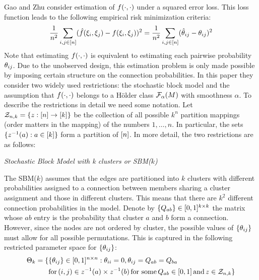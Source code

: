 \documentclass[11pt]{article}
\begin{document}
Gao and Zhu consider estimation of $f(\cdot, \cdot)$ under a squared error loss. This loss function leads to the following empirical risk minimization criteria:
\begin{equation}\label{eq:loss_func}
\frac{1}{n^2}\sum_{i, j \in \lbrack n\rbrack}(\hat{f}(\xi_i, \xi_j) - f(\xi_i, \xi_j))^2 =
\frac{1}{n^2}\sum_{i, j \in \lbrack n\rbrack}(\hat{\theta}_{ij} - \theta_{ij})^2
\end{equation}
Note that estimating $f(\cdot, \cdot)$ is equivalent to estimating each pairwise probability $\theta_{ij}$. Due to the unobserved design, this estimation problem is only made possible by imposing certain structure on the connection probabilities. In this paper they consider two widely used restrictions: the stochastic block model and the assumption that $f(\cdot, \cdot)$ belongs to a H\"older class $\mathcal{F}_{\alpha}(M)$ with smoothness $\alpha$. To describe the restrictions in detail we need some notation. Let $\mathcal{Z}_{n,k} = \{z : \lbrack n\rbrack \rightarrow \lbrack k\rbrack\}$ be the collection of all possible $k^n$ partition mappings (order matters in the mapping) of the numbers $1, \dots, n$. In particular, the sets $\{z^{-1}(a) : a \in \lbrack k\rbrack\}$ form a partition of $\lbrack n\rbrack$. In more detail, the two restrictions are as follows:

\begin{assump}\label{assump:sbm}
\textit{Stochastic Block Model with k clusters or SBM($k$)}

\noindent
The SBM($k$) assumes that the edges are partitioned into $k$ clusters with different probabilities assigned to a connection between members sharing a cluster assignment and those in different clusters. This means that there are $k^2$ different connection probabilities in the model. Denote by $\{Q_{ab}\} \in [0, 1]^{k \times k}$ the matrix whose $ab$ entry is the probability that cluster $a$ and $b$ form a connection. However, since the nodes are not ordered by cluster, the possible values of $\{\theta_{ij}\}$ must allow for all possible permutations. This is captured in the following restricted parameter space for $\{\theta_{ij}\}$:
\begin{equation}
\begin{aligned}
\Theta_k = \{&\{\theta_{ij}\} \in [0, 1]^{n \times n} : \theta_{ii} = 0, \theta_{ij} = Q_{ab} = Q_{ba}\\
    & \text{for} \, (i, j) \in z^{-1}(a) \times z^{-1}(b) \, \text{for some} \, Q_{ab} \in [0, 1] \, \text{and} \, z \in \mathcal{Z}_{n,k}\}
\end{aligned}
\end{equation}
\end{assump}
\end{document}

